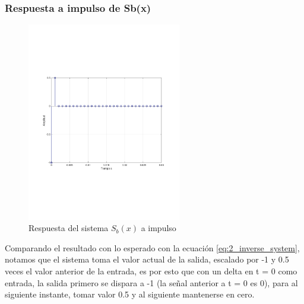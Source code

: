  		\subsubsection{Respuesta a impulso de Sb(x)}
 			\begin{figure}[H]
 				\center
 				\includegraphics[width=0.6\textwidth,clip, trim = {2cm 7.0cm 2.2cm 7.0cm}]{../imgs/2_Sb.pdf}
				\caption{Respuesta del sistema $S_{b}(x)$ a impulso}
 				\label{fig:2_Sb}
 			\end{figure}
 			
 			Comparando el resultado con lo esperado con la ecuación \ref{eq:2_inverse_system}, notamos que el sistema toma el valor actual de la salida, escalado por -1 y 0.5 veces el valor anterior de la entrada, es por esto que con un delta en t = 0  como entrada,  la salida primero se dispara a -1 (la señal anterior a t = 0 es 0), para al siguiente instante, tomar valor 0.5 y al siguiente mantenerse en cero. 
